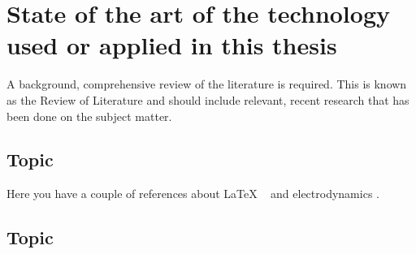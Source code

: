 \clearpage\section{State of the art of the technology used or applied in this thesis}

 {A background, comprehensive review of the literature is required. This is known as the Review of Literature and should
  include relevant, recent research that has been done on the subject matter.}

\subsection{Topic}

Here you have a couple of references about LaTeX ~\cite{latexcompanion} and electrodynamics \cite{einstein}.

\bigskip

\subsection{Topic}
